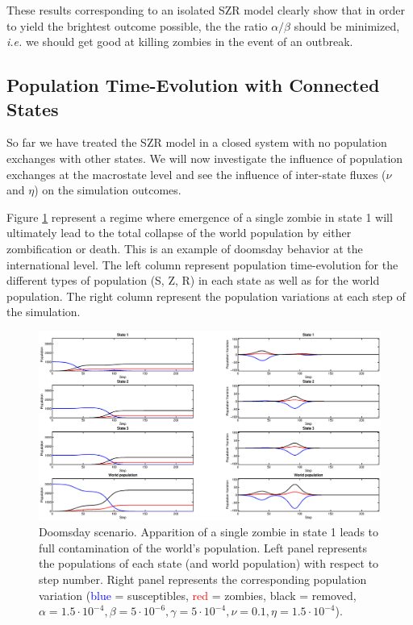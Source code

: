 \documentclass[11pt]{article} %
\begin{document}
These results corresponding to an isolated SZR model clearly show that in order to yield the brightest outcome possible, the the ratio $\alpha/\beta$ should be minimized, \textit{i.e.} we should get good at killing zombies in the event of an outbreak.


\subsection{Population Time-Evolution with Connected States}\indent
\label{sec:time-evolv}
 
So far we have treated the SZR model in a closed system with no population exchanges with other states. We will now investigate the influence of population exchanges at the macrostate level and see the influence of inter-state fluxes ($\nu$ and $\eta$) on the simulation outcomes. 

Figure \ref{doomsday} represent a regime where emergence of a single zombie in state 1 will ultimately lead to the total collapse of the world population by either zombification or death. This is an example of doomsday behavior at the international level. The left column represent population time-evolution for the different types of population (S, Z, R) in each state as well as for the world population. The right column represent the population variations at each step of the simulation. 
\begin{figure}[h!]
\centerline{
\includegraphics[scale=0.35]{../images/Matlab_figures/example_doomsday.eps}}
\caption{Doomsday scenario. Apparition of a single zombie in state 1 leads to full contamination of the world's population. Left panel represents the populations of each state (and world population) with respect to step number. Right panel represents the corresponding population variation (\textcolor{blue}{blue} = susceptibles, \textcolor{red}{red} = zombies, black = removed, $\alpha=1.5\cdot10^{-4}, \beta=5\cdot10^{-6}, \gamma=5\cdot10^{-4}, \nu=0.1, \eta=1.5\cdot10^{-4}$). \label{doomsday} }
\end{figure}
\end{document}
